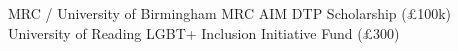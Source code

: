 {%
	MRC / University of Birmingham}
{%
	MRC AIM DTP Scholarship (£100k)}
{}
\vspace{0.5em}
{%
	University of Reading}
{%
	LGBT+ Inclusion Initiative Fund (£300)}
{}
